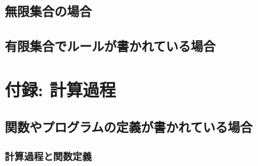 \documentclass[10pt, oneside]{jarticle}   	%
\theoremstyle{definition}
\begin{document}
\subsection{無限集合の場合}
\subsection{有限集合でルールが書かれている場合}

\section{付録: 計算過程}
\subsection{関数やプログラムの定義が書かれている場合}
\subsubsection{計算過程と関数定義}
\end{document}
